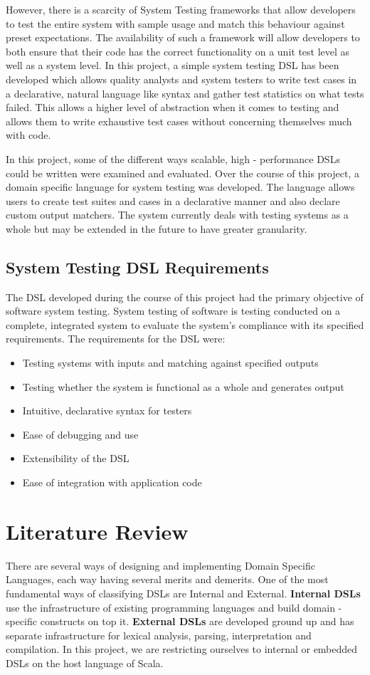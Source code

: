 \documentclass[12 pt]{article}
\begin{document}
\noindent
However, there is a scarcity of System Testing frameworks that allow developers to test the entire system with sample usage and match this behaviour against preset expectations. The availability of such a framework will allow developers to both ensure that their code has the correct functionality on a unit test level as well as a system level. In this project, a simple system testing DSL has been developed which allows quality analysts and system testers to write test cases in a declarative, natural language like syntax and gather test statistics on what tests failed. This allows a higher level of abstraction when it comes to testing and allows them to write exhaustive test cases without concerning themselves much with code.
\bigskip

\noindent
In this project, some of the different ways scalable, high - performance DSLs could be written were examined and evaluated. Over the course of this project, a domain specific language for system testing was developed. The language allows users to create test suites and cases in a declarative manner and also declare custom output matchers. The system currently deals with testing systems as a whole but may be extended in the future to have greater granularity.

\subsection{System Testing DSL Requirements}

The DSL developed during the course of this project had the primary objective of software system testing. System testing of software is testing conducted on a complete, integrated system to evaluate the system's compliance with its specified requirements. The requirements for the DSL were:
\begin{itemize}
\item Testing systems with inputs and matching against specified outputs
\item Testing whether the system is functional as a whole and generates output
\item Intuitive, declarative syntax for testers
\item Ease of debugging and use
\item Extensibility of the DSL
\item Ease of integration with application code
\end{itemize}

\newpage
\section{Literature Review}
There are several ways of designing and implementing Domain Specific Languages, each way having several merits and demerits. One of the most fundamental ways of classifying DSLs are Internal and External. \textbf{Internal DSLs} use the infrastructure of existing programming languages and build domain - specific constructs on top it. \textbf{External DSLs} are developed ground up and has separate infrastructure for lexical analysis, parsing, interpretation and compilation. In this project, we are restricting ourselves to internal or embedded DSLs on the host language of Scala.
\bigskip
\end{document}
